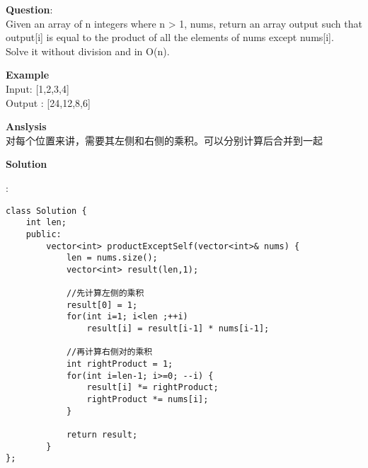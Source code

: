     
\begin{description}
    \item{\textbf{Question}}:\\%
		Given an array of n integers where n > 1, nums, return an array output such that output[i] is equal to the product of all the elements of nums except nums[i].\\
		Solve it without division and in O(n).\\

    \item{\textbf{Example}}\\
		Input: [1,2,3,4]\\
		Output : [24,12,8,6]\\

    \item{\textbf{Anslysis}}\\
		对每个位置来讲，需要其左侧和右侧的乘积。可以分别计算后合并到一起\\

    \item{\textbf{Solution}}\\
	\item{} : \\
		\begin{lstlisting}
class Solution {
	int len;
	public:
		vector<int> productExceptSelf(vector<int>& nums) {
			len = nums.size();
			vector<int> result(len,1);

			//先计算左侧的乘积
			result[0] = 1;
			for(int i=1; i<len ;++i)
				result[i] = result[i-1] * nums[i-1];

			//再计算右侧对的乘积
			int rightProduct = 1;
			for(int i=len-1; i>=0; --i) {
				result[i] *= rightProduct;
				rightProduct *= nums[i];
			}

			return result;
		}
};
		\end{lstlisting}

\end{description}

